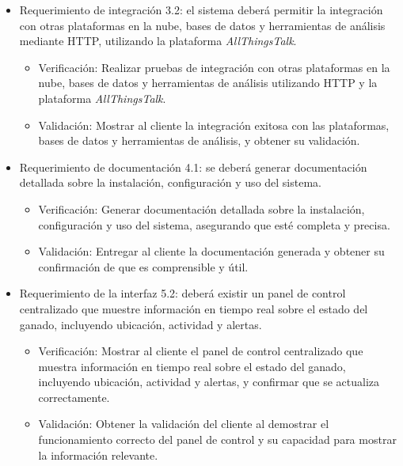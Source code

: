 \documentclass[
11pt, %
]{charter}
\begin{document}
\begin{itemize}
\item Requerimiento de integración 3.2: el sistema deberá permitir la integración con otras plataformas en la nube, bases
de datos y herramientas de análisis mediante HTTP, utilizando la plataforma \emph{AllThingsTalk}.
\begin{itemize}
\item Verificación: Realizar pruebas de integración con otras plataformas en la nube, bases de datos y herramientas de análisis utilizando HTTP y la plataforma \emph{AllThingsTalk}.
\item Validación: Mostrar al cliente la integración exitosa con las plataformas, bases de datos y herramientas de análisis, y obtener su validación.
\end{itemize}
\end{itemize}

\begin{itemize}
\item Requerimiento de documentación 4.1: se deberá generar documentación detallada sobre la instalación, configuración y uso
del sistema.
\begin{itemize}
\item Verificación: Generar documentación detallada sobre la instalación, configuración y uso del sistema, asegurando que esté completa y precisa.
\item Validación: Entregar al cliente la documentación generada y obtener su confirmación de que es comprensible y útil.
\end{itemize}
\end{itemize}

\begin{itemize}
\item Requerimiento de la interfaz 5.2: deberá existir un panel de control centralizado que muestre información en tiempo real sobre el estado del ganado, incluyendo ubicación, actividad y alertas.
\begin{itemize}
\item Verificación: Mostrar al cliente el panel de control centralizado que muestra información en tiempo real sobre el estado del ganado, incluyendo ubicación, actividad y alertas, y confirmar que se actualiza correctamente.
\item Validación: Obtener la validación del cliente al demostrar el funcionamiento correcto del panel de control y su capacidad para mostrar la información relevante.
\end{itemize}
\end{itemize}
\end{document}
